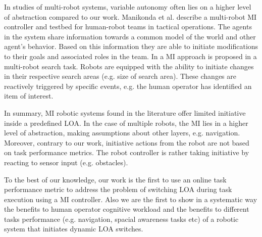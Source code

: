 \documentclass[a4paper,12pt,oneside,openright]{bhamthesis}
\begin{document}
In studies of multi-robot systems, variable autonomy often lies on a higher level of abstraction compared to our work. Manikonda et al. \cite{Manikonda2007} describe a multi-robot MI controller and testbed for human-robot teams in tactical operations. The agents in the system share information towards a common model of the world and other agent's behavior. Based on this information they are able to initiate modifications to their goals and associated roles in the team. In \cite{Hardin2009} a MI approach is proposed in a multi-robot search task. Robots are equipped with the ability to initiate changes in their respective search areas (e.g. size of search area). These changes are reactively triggered by specific events, e.g. the human operator has identified an item of interest.

In summary, MI robotic systems found in the literature offer limited initiative inside a predefined LOA. In the case of multiple robots, the MI lies in a higher level of abstraction, making assumptions about other layers, e.g. navigation. Moreover, contrary to our work, initiative actions from the robot are not based on task performance metrics. The robot controller is rather taking initiative by reacting to sensor input (e.g. obstacles).

To the best of our knowledge, our work is the first to use an online task performance metric to address the problem of switching LOA during task execution using a MI controller. Also we are the first to show in a systematic way the benefits to human operator cognitive workload and the benefits to different tasks performance (e.g. navigation, spacial awareness tasks etc) of a robotic system that initiates dynamic LOA switches. 
\end{document}
